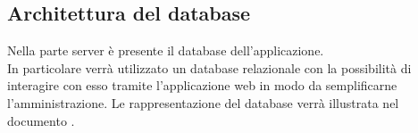 	\subsection{Architettura del database}
	\label{architetturaDelDatabase}
	Nella parte server è presente il database dell'applicazione.\\
	In particolare verrà utilizzato un database relazionale  con la possibilità di interagire con esso tramite l'applicazione web  in modo da semplificarne l'amministrazione.
	Le rappresentazione del database verrà illustrata nel documento \DPdoc.
		